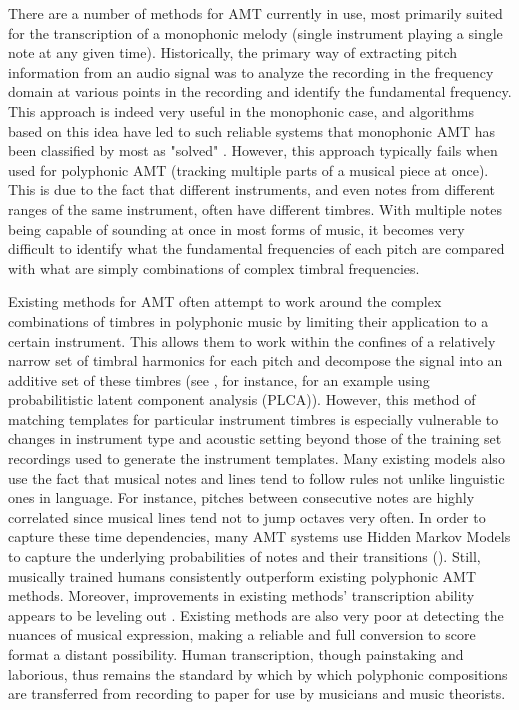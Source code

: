 \documentclass[conference]{IEEEtran}
\begin{document}
There are a number of methods for AMT currently in use, most primarily suited for the transcription of a monophonic melody (single instrument playing a single note at any given time). Historically, the primary way of extracting pitch information from an audio signal was to analyze the recording in the frequency domain at various points in the recording and identify the fundamental frequency. This approach is indeed very useful in the monophonic case, and algorithms based on this idea have led to such reliable systems that monophonic AMT has been classified by most as "solved" \cite{benetos}. However, this approach typically fails when used for polyphonic AMT (tracking multiple parts of a musical piece at once). This is due to the fact that different instruments, and even notes from different ranges of the same instrument, often have different timbres. With multiple notes being capable of sounding at once in most forms of music, it becomes very difficult to identify what the fundamental frequencies of each pitch are compared with what are simply combinations of complex timbral frequencies.

Existing methods for AMT often attempt to work around the complex combinations of timbres in polyphonic music by limiting their application to a certain instrument. This allows them to work within the confines of a relatively narrow set of timbral harmonics for each pitch and decompose the signal into an additive set of these timbres (see \cite{benetos2}, for instance, for an example using probabilitistic latent component analysis (PLCA)). However, this method of matching templates for particular instrument timbres is especially vulnerable to changes in instrument type and acoustic setting beyond those of the training set recordings used to generate the instrument templates. Many existing models also use the fact that musical notes and lines tend to follow rules not unlike linguistic ones in language. For instance, pitches between consecutive notes are highly correlated since musical lines tend not to jump octaves very often. In order to capture these time dependencies, many AMT systems use Hidden Markov Models to capture the underlying probabilities of notes and their transitions (\cite{sigtia}). Still, musically trained humans consistently outperform existing polyphonic AMT methods. Moreover, improvements in existing methods' transcription ability appears to be leveling out \cite{benetos} \cite{humphrey}. Existing methods are also very poor at detecting the nuances of musical expression, making a reliable and full conversion to score format a distant possibility. Human transcription, though painstaking and laborious, thus remains the standard by which by which polyphonic compositions are transferred from recording to paper for use by musicians and music theorists.
\end{document}
